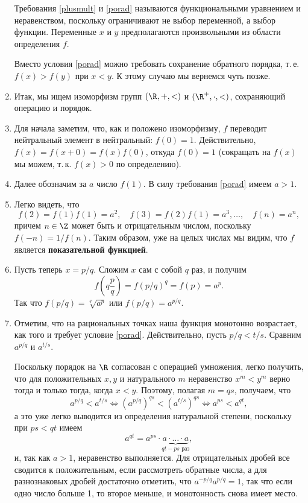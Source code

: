 \begin{enumerate}
Требования \eqref{plusmult} и \eqref{porad} называются функциональными уравнением и неравенством, поскольку ограничивают не выбор переменной, а выбор функции. Переменные $x$ и $y$ предполагаются произвольными из области определения $f$.

Вместо условия \eqref{porad} можно требовать сохранение обратного порядка, т.\,е. $f(x)>f(y)$ при $x<y$. К этому случаю мы вернемся чуть позже.

\item Итак, мы ищем изоморфизм групп $(\R,+,<)$ и $(\R^+,\cdot,<)$, сохраняющий операцию и порядок.
\item Для начала заметим, что, как и положено изоморфизму, $f$ переводит нейтральный элемент в нейтральный: $f(0)=1$. Действительно, $f(x)=f(x+0)=f(x)f(0)$, откуда $f(0)=1$ (сокращать на $f(x)$ мы можем, т.\,к. $f(x)>0$ по определению).
\item Далее обозначим за $a$ число $f(1)$. В силу требования \eqref{porad} имеем $a>1$.
\item Легко видеть, что
$$
f(2)=f(1)f(1)=a^2,\quad f(3)=f(2)f(1)=a^3,\dots,\quad f(n)=a^n,
$$
причем $n\in\Z$ может быть и отрицательным числом, поскольку $f(-n)=1/f(n)$. Таким образом, уже на целых числах мы видим, что $f$ является \textbf{показательной функцией}.
\item Пусть теперь $x=p/q$. Сложим $x$ сам с собой $q$ раз, и получим
$$
f\left(q\frac pq\right) = f(p/q)^q = f(p) = a^p.
$$
Так что $f(p/q)=\sqrt[q]{a^p}$ или $f(p/q)=a^{p/q}$.

\item Отметим, что на рациональных точках наша функция монотонно возрастает, как того и требует условие \eqref{porad}. Действительно, пусть $p/q<t/s$. Сравним $a^{p/q}$ и $a^{t/s}$.

Поскольку порядок на $\R$ согласован с операцией умножения, легко получить, что для положительных $x,y$ и натурального $m$ неравенство $x^m<y^m$ верно тогда и только тогда, когда $x<y$. Поэтому, полагая $m=qs$, получаем, что
$$
a^{p/q}<a^{t/s}\Leftrightarrow (a^{p/q})^{qs}<(a^{t/s})^{qs}\Leftrightarrow a^{ps}<a^{qt},
$$
а это уже легко выводится из определения натуральной степени, поскольку при $ps<qt$ имеем
$$
a^{qt}=a^{ps}\cdot\underbrace{a\cdot\dots\cdot a}_{qt-ps\mbox{ раз}},
$$
и, так как $a>1$, неравенство выполняется. Для отрицательных дробей все сводится к положительным, если рассмотреть обратные числа, а для разнознаковых дробей достаточно отметить, что $a^{-p/q}a^{p/q}=1$, так что если одно число больше 1, то второе меньше, и монотонность снова имеет место.




\end{enumerate}
